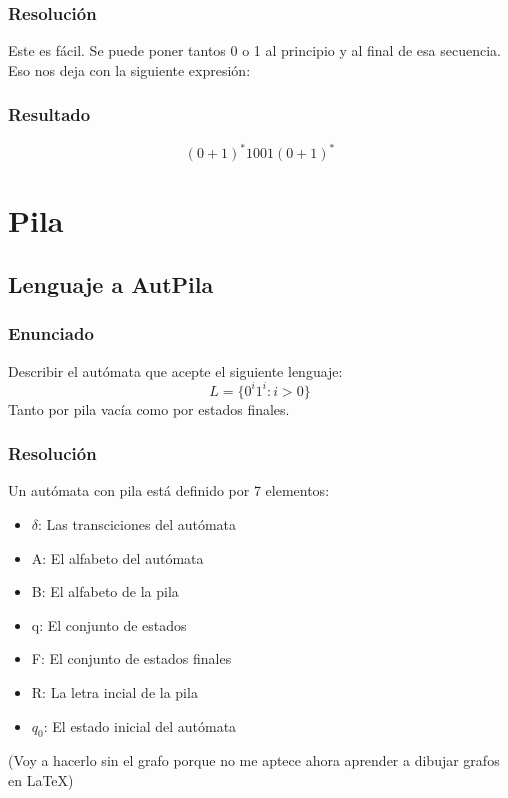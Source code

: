 \documentclass[12pt]{article}
\begin{document}
\subsubsection{Resolución}
Este es fácil. Se puede poner tantos 0 o 1 al principio y al final de esa secuencia. Eso nos deja con la siguiente expresión:
\subsubsection{Resultado}
\[(0 + 1)^*1001(0 + 1)^*\]
\newpage
\section{Pila}
\subsection{Lenguaje a AutPila}
\subsubsection{Enunciado}
Describir el autómata que acepte el siguiente lenguaje: 
\[L = \{0^i1^i : i > 0\}\]
Tanto por pila vacía como por estados finales. 
\subsubsection{Resolución}
Un autómata con pila está definido por 7 elementos:
\begin{itemize}
    \item $\delta$: Las transciciones del autómata 
    \item A: El alfabeto del autómata 
    \item B: El alfabeto de la pila 
    \item q: El conjunto de estados 
    \item F: El conjunto de estados finales 
    \item R: La letra incial de la pila 
    \item $q_0$: El estado inicial del autómata 
\end{itemize}
(Voy a hacerlo sin el grafo porque no me aptece ahora aprender a dibujar grafos en LaTeX)
\end{document}
